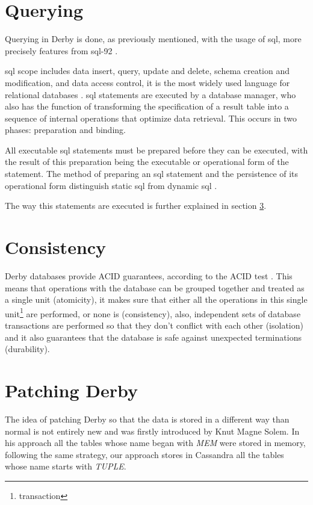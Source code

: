 \section{Querying}
Querying in Derby is done, as previously mentioned, with the usage of \ac{sql}, more precisely features from \ac{sql}-92 \cite{derbySQL}.

\ac{sql} scope includes data insert, query, update and delete, schema creation and modification, and data access control, it is the most widely used language for relational databases \cite{SQLintro}. \ac{sql} statements are executed by a database manager, who also has the function of transforming the specification of a result table into a sequence of internal operations that optimize data retrieval. This  occurs in two phases: preparation and binding.

All executable \ac{sql} statements must be prepared before they can be executed, with the result of this preparation being the executable or operational form of the statement. The method of preparing an \ac{sql} statement and the persistence of its operational form distinguish static \ac{sql} from dynamic \ac{sql} \cite{SQLibm}.

The way this statements are executed is further explained in section \ref{sec:patch}. 

\section{Consistency}
Derby databases provide ACID guarantees, according to the ACID test \cite{derbydevIBM}. This means that operations with the database can be grouped together and treated as a single unit (atomicity), it makes sure that either all the operations in this single unit\footnote{transaction} are performed, or none is (consistency), also, independent sets of database transactions are performed so that they don't conflict with each other (isolation) and it also guarantees that the database is safe against unexpected terminations (durability).

\section{Patching Derby}
\label{sec:patch}

The idea of patching Derby so that the data is stored in a different way than normal is not entirely new and was firstly introduced by Knut Magne Solem\cite{derbyPatch}. In his approach all the tables whose name began with \emph{MEM} were stored in memory, following the same strategy, our approach stores in Cassandra all the tables whose name starts with \emph{TUPLE}.

